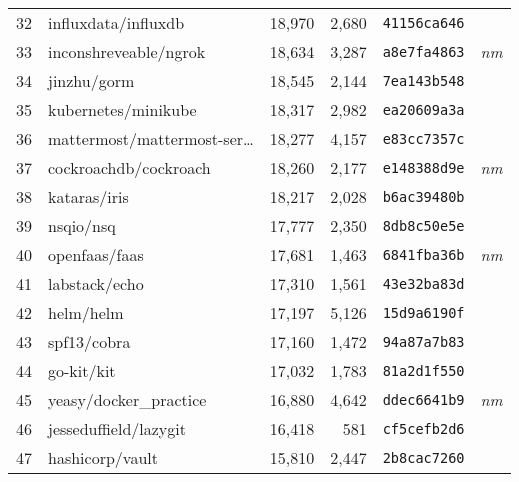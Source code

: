 {\begin{supertabular}{llrrll}
        32  &                influxdata/influxdb & 18,970 &  2,680 &  \texttt{41156ca646} &              \\
        33  &              inconshreveable/ngrok & 18,634 &  3,287 &  \texttt{a8e7fa4863} &  \textit{nm} \\
        34  &                        jinzhu/gorm & 18,545 &  2,144 &  \texttt{7ea143b548} &              \\
        35  &                kubernetes/minikube & 18,317 &  2,982 &  \texttt{ea20609a3a} &              \\
        36  &    mattermost/mattermost-ser\ldots & 18,277 &  4,157 &  \texttt{e83cc7357c} &              \\
        37  &              cockroachdb/cockroach & 18,260 &  2,177 &  \texttt{e148388d9e} &  \textit{nm} \\
        38  &                       kataras/iris & 18,217 &  2,028 &  \texttt{b6ac39480b} &              \\
        39  &                          nsqio/nsq & 17,777 &  2,350 &  \texttt{8db8c50e5e} &              \\
        40  &                      openfaas/faas & 17,681 &  1,463 &  \texttt{6841fba36b} &  \textit{nm} \\
        41  &                      labstack/echo & 17,310 &  1,561 &  \texttt{43e32ba83d} &              \\
        42  &                          helm/helm & 17,197 &  5,126 &  \texttt{15d9a6190f} &              \\
        43  &                        spf13/cobra & 17,160 &  1,472 &  \texttt{94a87a7b83} &              \\
        44  &                         go-kit/kit & 17,032 &  1,783 &  \texttt{81a2d1f550} &              \\
        45  &             yeasy/docker\_practice & 16,880 &  4,642 &  \texttt{ddec6641b9} &  \textit{nm} \\
        46  &              jesseduffield/lazygit & 16,418 &    581 &  \texttt{cf5cefb2d6} &              \\
        47  &                    hashicorp/vault & 15,810 &  2,447 &  \texttt{2b8cac7260} &              \\

\end{supertabular}}
